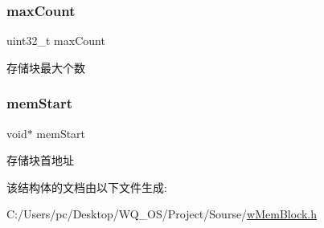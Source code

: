 \subsubsection{\texorpdfstring{max\+Count}{maxCount}}
{\footnotesize\ttfamily uint32\+\_\+t max\+Count}

存储块最大个数 \mbox{\label{struct__w_mem_block_a278e5d28605731490bb61cb8d313a5f3}} 
\subsubsection{\texorpdfstring{mem\+Start}{memStart}}
{\footnotesize\ttfamily void$\ast$ mem\+Start}

存储块首地址 

该结构体的文档由以下文件生成\+:\begin{DoxyCompactItemize}
\item 
C\+:/\+Users/pc/\+Desktop/\+W\+Q\+\_\+\+O\+S/\+Project/\+Sourse/\mbox{\hyperlink{w_mem_block_8h}{w\+Mem\+Block.\+h}}\end{DoxyCompactItemize}
